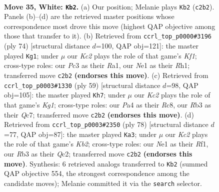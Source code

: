 \documentclass[11pt]{article}
\begin{document}
\clearpage

\begin{figure}[p]\centering
\begin{subfigure}{0.46\textwidth}\centering
\resizebox{\linewidth}{!}{%
\newchessgame
\chessboard[
  setfen={1n3r1k/2pnq2p/rp2p1p1/p3Pp2/P2P1P1P/1RP3N1/2K3PQ/4NR2 w - - 11 35},
  showmover=false,
  pgfstyle=straightmove, color=movearrow, markmove={c2-b2}
]}
\caption{}
\end{subfigure}\hfill
\begin{subfigure}{0.46\textwidth}\centering
\resizebox{\linewidth}{!}{%
\newchessgame
\chessboard[
  setfen={1r2r3/6k1/3nqpn1/1p1p2p1/2pP3p/P1N1PN1P/1Q3PP1/R4K1R w - - 14 38},
  showmover=false,
  pgfstyle=straightmove, color=movearrow, markmove={f1-g1}
]}
\caption{}
\end{subfigure}
\\[4pt]
\begin{subfigure}{0.46\textwidth}\centering
\resizebox{\linewidth}{!}{%
\newchessgame
\chessboard[
  setfen={2r3k1/2qr1pp1/pp1ppnnp/8/2P1P3/1PNRQN1P/P4PP1/3R2K1 b - - 5 30},
  showmover=false,
  pgfstyle=straightmove, color=movearrow, markmove={g8-h7}
]}
\caption{}
\end{subfigure}\hfill
\begin{subfigure}{0.46\textwidth}\centering
\resizebox{\linewidth}{!}{%
\newchessgame
\chessboard[
  setfen={3qrnk1/5rp1/3p2n1/pNpPppP1/P1P4p/1P3P1N/1KQ4P/4RR2 w - - 14 40},
  showmover=false,
  pgfstyle=straightmove, color=movearrow, markmove={b2-a3}
]}
\caption{}
\end{subfigure}
\caption{\textbf{Move 35, White: \texttt{Kb2}.} (a) Our position; Melanie plays \texttt{Kb2} (\texttt{c2b2}). Panels (b)--(d) are the retrieved master positions whose correspondence most drove this move (highest QAP objective among those that transfer to it). (b) Retrieved from \texttt{ccrl\_top\_p0000\#3196} (ply 74) [structural distance $d$=100, QAP obj=121]: the master played \texttt{Kg1}; under $\mu$ our \emph{Kc2} plays the role of that game's \emph{Kf1}; cross-type roles: our \emph{P}c3 as their \emph{R}a1, our \emph{N}e1 as their \emph{R}h1; transferred move \texttt{c2b2} \textbf{(endorses this move)}. (c) Retrieved from \texttt{ccrl\_top\_p0003\#1330} (ply 59) [structural distance $d$=98, QAP obj=105]: the master played \texttt{Kh7}; under $\mu$ our \emph{Kc2} plays the role of that game's \emph{Kg1}; cross-type roles: our \emph{P}a4 as their \emph{R}c8, our \emph{R}b3 as their \emph{Q}c7; transferred move \texttt{c2b2} \textbf{(endorses this move)}. (d) Retrieved from \texttt{ccrl\_top\_p0003\#2350} (ply 78) [structural distance $d$=77, QAP obj=87]: the master played \texttt{Ka3}; under $\mu$ our \emph{Kc2} plays the role of that game's \emph{Kb2}; cross-type roles: our \emph{N}e1 as their \emph{R}f1, our \emph{R}b3 as their \emph{Q}c2; transferred move \texttt{c2b2} \textbf{(endorses this move)}. Synthesis: 6 retrieved analogs transferred to \texttt{Kb2} (summed QAP objective 554, the strongest correspondence among the candidate moves); Melanie committed it via the \texttt{search} selector.}
\label{fig:thought-m68}
\end{figure}
\end{document}
